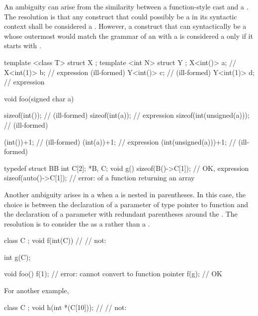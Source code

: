 \pnum
An ambiguity can arise from the similarity between a function-style
cast and a
.
The resolution is that any construct that could possibly be a
in its syntactic context shall be considered a
.
However, a construct that can syntactically be a 
whose outermost 
would match the grammar of an 
with a 
is considered a  only if it starts with .
\begin{example}
\begin{codeblock}
template <class T> struct X {};
template <int N> struct Y {};
X<int()> a;                     // 
X<int(1)> b;                    // expression (ill-formed)
Y<int()> c;                     //  (ill-formed)
Y<int(1)> d;                    // expression

void foo(signed char a) {
  sizeof(int());                //  (ill-formed)
  sizeof(int(a));               // expression
  sizeof(int(unsigned(a)));     //  (ill-formed)

  (int())+1;                    //  (ill-formed)
  (int(a))+1;                   // expression
  (int(unsigned(a)))+1;         //  (ill-formed)
}

typedef struct BB { int C[2]; } *B, C;
void g() {
  sizeof(B()->C[1]);            // OK, expression\tcode{)}
  sizeof(auto()->C[1]);         // error:  of a function returning an array
}
\end{codeblock}
\end{example}

\pnum
Another ambiguity arises in a
 when a
is nested in parentheses.
In this case, the choice is between the declaration of a parameter of type
pointer to function and the declaration of a parameter with redundant
parentheses around the
.
The resolution is to consider the
as a
rather than a
.
\begin{example}
\begin{codeblock}
class C { };
void f(int(C)) { }              // 
                                // not: 

int g(C);

void foo() {
  f(1);                         // error: cannot convert  to function pointer
  f(g);                         // OK
}
\end{codeblock}

For another example,
\begin{codeblock}
class C { };
void h(int *(C[10]));           // 
                                // not: 
\end{codeblock}
\end{example}

